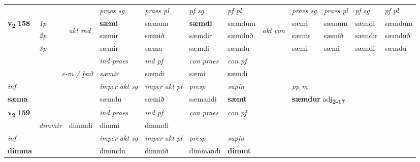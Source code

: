 \begin{longtable}[l]{X>{\footnotesize\itshape}llXXXXlXXXX}
 & &   & \textit{praes sg}  & \textit{praes pl}    & \textit{ pf sg} & \textit{pf pl} & & \textit{praes sg}  & \textit{praes pl}    & \textit{pf sg} & \textit{pf pl }  \\ \cmidrule{4-7} \cmidrule{9-12}
 \multirow{2}{*}{{{\textbf{v{\textsubscript{2}}} \Large{\textbf{158}}}}}  & 1p & \multirow{3}{*}{\begin{turn}{90}\textit{akt ind}\end{turn}} & \textbf{sæmi} & sæmum & \textbf{sæmdi} & sæmdum & \multirow{3}{*}{\begin{turn}{90}\textit{akt con}\end{turn}} &sæmi & sæmum & sæmdi & sæmdum\\*
 & 2p &  &  sæmir  & sæmið & sæmdir & sæmduð & & sæmir & sæmið & sæmdir & sæmduð \\*
 & 3p &  & sæmir & sæma & sæmdi & sæmdu & & sæmi & sæmi& sæmdi & sæmdu \\*
\cmidrule{4-7} \cmidrule{9-12}

   && &  \textit{ind praes} & \textit{ind pf} & \textit{con praes} & \textit{con pf} \\*
\multicolumn{3}{r}{\textit{e-m / það}} & sæmir & sæmdi & sæmi & sæmdi \\*

\cmidrule{4-7}
   {\textit{inf}} & &  & \textit{imper akt sg} & \textit{imper akt pl}   & \textit{presp} & \textit{supin}  && \textit{pp m} \\*
  {\textbf{sæma}} & && sæmdu  & sæmið   & sæmandi &  \textbf{sæmt}  && \multicolumn{2}{l}{\textbf{sæmdur} adj\textbf{\textsubscript{2-17}}} \\*

\midrule

\multirow{2}{*}{{{\textbf{v{\textsubscript{2}}} \Large{\textbf{159}}}}}  &&&  \textit{ind praes} & \textit{ind pf} & \textit{con praes} & \textit{con pf} \\*
\multicolumn{3}{r}{\textit{e-m / það}} & dimmir & dimmdi & dimmi & dimmdi \\*

\cmidrule{4-7}
   {\textit{inf}} & &  & \textit{imper akt sg} & \textit{imper akt pl}   & \textit{presp} & \textit{supin}   \\*
  {\textbf{dimma}} & && dimmdu  & dimmið   & dimmandi &  \textbf{dimmt}   \\*

\midrule


\end{longtable}
